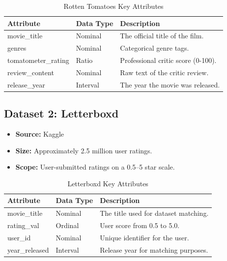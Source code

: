 \documentclass[conference]{IEEEtran}
\begin{document}
\begin{table}[htbp]
  \caption{Rotten Tomatoes Key Attributes}
  \begin{center}
    \begin{tabularx}{\columnwidth}{|l|l|X|}
      \hline
      \textbf{Attribute}  & \textbf{Data Type} & \textbf{Description}               \\ \hline
      movie\_title        & Nominal            & The official title of the film.    \\ \hline
      genres              & Nominal            & Categorical genre tags.            \\ \hline
      tomatometer\_rating & Ratio              & Professional critic score (0-100). \\ \hline
      review\_content     & Nominal            & Raw text of the critic review.     \\ \hline
      release\_year       & Interval           & The year the movie was released.   \\ \hline
    \end{tabularx}
    \label{tab1}
  \end{center}
\end{table}

\subsection{Dataset 2: Letterboxd}
\begin{itemize}
  \item \textbf{Source:} Kaggle \cite{letterboxd2020}
  \item \textbf{Size:} Approximately 2.5 million user ratings.
  \item \textbf{Scope:} User-submitted ratings on a 0.5--5 star scale.
\end{itemize}

\begin{table}[htbp]
  \caption{Letterboxd Key Attributes}
  \begin{center}
    \begin{tabularx}{\columnwidth}{|l|l|X|}
      \hline
      \textbf{Attribute} & \textbf{Data Type} & \textbf{Description}                 \\ \hline
      movie\_title       & Nominal            & The title used for dataset matching. \\ \hline
      rating\_val        & Ordinal            & User score from 0.5 to 5.0.          \\ \hline
      user\_id           & Nominal            & Unique identifier for the user.      \\ \hline
      year\_released     & Interval           & Release year for matching purposes.  \\ \hline
    \end{tabularx}
    \label{tab2}
  \end{center}
\end{table}
\end{document}
